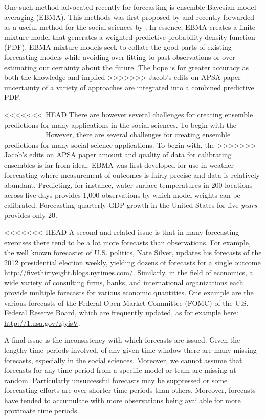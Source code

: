 \documentclass[12pt,fullpage,endnotes]{article}
\begin{document}
One such method advocated recently for forecasting is ensemble
Bayesian model averaging (EBMA). This methods was first proposed by
\citet{Raftery:2005} and recently forwarded as a useful method for the
social sciences by \citet{mhw:2012}. In essence, EBMA creates a finite
mixture model that generates a weighted predictive probability density
function (PDF).  EBMA mixture models seek to collate the good
parts of existing forecasting models while avoiding over-fitting to
past observations or over-estimating our certainty about the future.
The hope is for greater accuracy as both the knowledge and implied
>>>>>>> Jacob's edits on APSA paper
uncertainty of a variety of approaches are integrated into a combined
predictive PDF.

<<<<<<< HEAD
There are however several challenges for creating ensemble
predictions for many applications in the social sciences.  To begin with the
=======
However, there are several challenges for creating ensemble
predictions for many social science applications.  To begin with, the
>>>>>>> Jacob's edits on APSA paper
amount and quality of data for calibrating ensembles is far from
ideal.  EBMA was first developed for use in weather forecasting where
measurement of outcomes is fairly precise and data is relatively
abundant.  Predicting, for instance, water surface temperatures in 200
locations across five days provides 1,000 observations by which model
weights can be calibrated.  Forecasting quarterly GDP growth in the
United States for five \textit{years} provides only 20.

<<<<<<< HEAD
A second and related issue is that in many forecasting exercises there tend to be a lot more
forecasts than observations.  For example, the well known forecaster of U.S. politics, Nate Silver,
updates his forecasts of the 2012 presidential election weekly, yielding dozens of forecasts
for a single outcome \url{http://fivethirtyeight.blogs.nytimes.com/}.  Similarly, in the field of economics, a wide variety of consulting firms, banks, and international organizations each provide multiple
forecasts for various economic quantities. One example are the various forecasts of the Federal Open Market Committee (FOMC) of the U.S. Federal Reserve Board, which are frequently updated, as for example here: \url{http://1.usa.gov/zjyisV}.

A final issue is the inconsistency with which forecasts are
issued. Given the lengthy time periods involved, of any given time
window there are many missing forecasts, especially in the social sciences.  Moreover, we cannot assume
that forecasts for any time period from a specific model or team are
missing at random.  Particularly unsuccessful forecasts may be
suppressed or some forecasting efforts are over shorter time-periods than others. Moreover, forecasts have tended to accumulate with more
observations being available for more proximate time periods.
\end{document}
